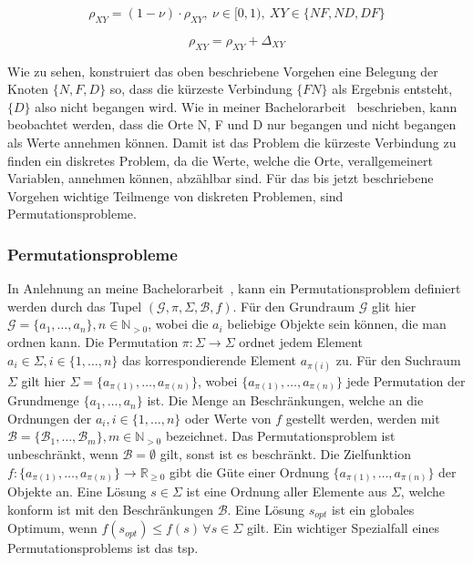 \documentclass[fontsize=12, a4aper]{scrartcl}
\begin{document}
	\begin{equation} \label{subsubsec:Einfuehrung_In_Ameisenalgorithmen:Mathematische_Beschreibung_Der_Nahrungssuche_Von_Ameisen:eq:Verdunstung}
		\rho_{XY} = (1-\nu)\cdot\rho_{XY}, ~ \nu \in [0,1), ~ XY \in \{NF, ND, DF\}
	\end{equation}
	
	\begin{equation} \label{subsubsec:Einfuehrung_In_Ameisenalgorithmen:Mathematische_Beschreibung_Der_Nahrungssuche_Von_Ameisen_eq:Pheromonablage}
		\rho_{XY} = \rho_{XY} + \Delta_{XY}
	\end{equation}
	
	Wie zu sehen, konstruiert das oben beschriebene Vorgehen eine Belegung der Knoten \(\{N, F, D\}\) so, dass die kürzeste Verbindung \(\{FN\}\) als Ergebnis entsteht, \(\{D\}\) also nicht begangen wird. Wie in meiner Bachelorarbeit~\cite{FCM_2019} beschrieben, kann beobachtet werden, dass die Orte N, F und D nur begangen und nicht begangen als Werte annehmen können. Damit ist das Problem die kürzeste Verbindung zu finden ein diskretes Problem, da die Werte, welche die Orte, verallgemeinert Variablen, annehmen können, abzählbar sind. Für das bis jetzt beschriebene Vorgehen wichtige Teilmenge von diskreten Problemen, sind Permutationsprobleme.
	
	\subsubsection{Permutationsprobleme} \label{subsubsec:Einfuehrung_In_Ameisenalgorithmen:Permuationsprobleme}
	
	In Anlehnung an meine Bachelorarbeit~\cite{FCM_2019}, kann ein Permutationsproblem definiert werden durch das Tupel \((\mathcal{G}, \pi, \Sigma, \mathcal{B}, f)\). Für den Grundraum \(\mathcal{G}\) glit hier \(\mathcal{G} = \{a_1, \dots, a_n\}, n \in \mathbb{N}_{>0}\), wobei die \(a_i\) beliebige Objekte sein können, die man ordnen kann. Die Permutation \(\pi: \Sigma \to \Sigma\) ordnet jedem Element \(a_i \in \Sigma, i \in \{1, \dots, n\}\) das korrespondierende Element \(a_{\pi(i)}\) zu. Für den Suchraum \(\Sigma\) gilt hier \(\Sigma = \{a_{\pi(1)}, \dots, a_{\pi(n)}\}\), wobei \(\{a_{\pi(1)}, \dots, a_{\pi(n)}\}\) jede Permutation der Grundmenge \(\{a_1, \dots, a_n\}\) ist. Die Menge an Beschränkungen, welche an die Ordnungen der \(a_i, i \in \{1, \dots, n\}\) oder Werte von \(f\) gestellt werden, werden mit \(\mathcal{B} = \{\mathcal{B}_1, \dots, \mathcal{B}_m\}, m \in \mathbb{N}_{>0}\) bezeichnet. Das Permutationsproblem ist unbeschränkt, wenn \(\mathcal{B} = \emptyset\) gilt, sonst ist es beschränkt. Die Zielfunktion \(f: \{a_{\pi(1)}, \dots, a_{\pi(n)}\} \to \mathbb{R}_{\geq 0}\) gibt die Güte einer Ordnung \(\{a_{\pi(1)}, \dots, a_{\pi(n)}\}\) der Objekte an. Eine Lösung \(s \in \Sigma\) ist eine Ordnung aller Elemente aus \(\Sigma\), welche konform ist mit den Beschränkungen \(\mathcal{B}\). Eine Lösung \(s_{opt}\) ist ein globales Optimum, wenn \(f(s_{opt}) \leq f(s) \, \forall s \in \Sigma\) gilt. Ein wichtiger Spezialfall eines Permutationsproblems ist das \ac{tsp}.
	
\end{document}
